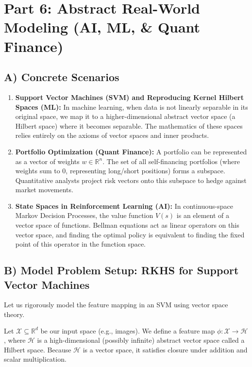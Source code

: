 \documentclass[12pt]{article}
\begin{document}
\newpage

\section{Part 6: Abstract Real-World Modeling (AI, ML, \& Quant Finance)}

\subsection{A) Concrete Scenarios}
\begin{enumerate}
    \item \textbf{Support Vector Machines (SVM) and Reproducing Kernel Hilbert Spaces (ML):} In machine learning, when data is not linearly separable in its original space, we map it to a higher-dimensional abstract vector space (a Hilbert space) where it becomes separable. The mathematics of these spaces relies entirely on the axioms of vector spaces and inner products.
    \item \textbf{Portfolio Optimization (Quant Finance):} A portfolio can be represented as a vector of weights $w \in \mathbb{R}^n$. The set of all self-financing portfolios (where weights sum to 0, representing long/short positions) forms a subspace. Quantitative analysts project risk vectors onto this subspace to hedge against market movements.
    \item \textbf{State Spaces in Reinforcement Learning (AI):} In continuous-space Markov Decision Processes, the value function $V(s)$ is an element of a vector space of functions. Bellman equations act as linear operators on this vector space, and finding the optimal policy is equivalent to finding the fixed point of this operator in the function space.
\end{enumerate}

\subsection{B) Model Problem Setup: RKHS for Support Vector Machines}
Let us rigorously model the feature mapping in an SVM using vector space theory.

Let $\mathcal{X} \subseteq \mathbb{R}^d$ be our input space (e.g., images). We define a feature map $\phi: \mathcal{X} \to \mathcal{H}$, where $\mathcal{H}$ is a high-dimensional (possibly infinite) abstract vector space called a Hilbert space. Because $\mathcal{H}$ is a vector space, it satisfies closure under addition and scalar multiplication.
\end{document}
